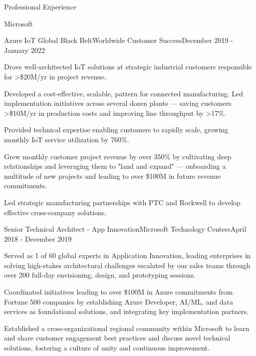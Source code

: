 \documentclass{resume} %
\begin{document}
\begin{rSection}{Professional Experience}
\begin{rCompany}{Microsoft}{}{}
    \begin{rSubSubsection}{Azure IoT Global Black Belt}{Worldwide Customer Success}{December 2019 - January 2022}
        \item Drove well-architected IoT solutions at strategic industrial customers responsible for >\$20M/yr in project revenue. 
        \item Developed a cost-effective, scalable, pattern for connected manufacturing. Led implementation initiatives across several dozen plants --- saving customers >\$10M/yr in production costs and improving line throughput by >17\%. 
        \item Provided technical expertise enabling customers to rapidly scale, growing monthly IoT service utilization by 760\%.
        \item Grew monthly customer project revenue by over 350\% by cultivating deep relationships and leveraging them to "land and expand" --- onboarding a multitude of new projects and leading to over \$100M in future revenue commitments.\
        \item Led strategic manufacturing partnerships with PTC and Rockwell to develop effective cross-company solutions.
    \end{rSubSubsection}
    
    \begin{rSubSubsection}{Senior Technical Architect - App Innovation}{Microsoft Technology Centers}{April 2018 - December 2019}
        \item Served as 1 of 60 global experts in Application Innovation, leading enterprises in solving high-stakes architectural challenges escalated by our sales teams through over 200 full-day envisioning, design, and prototyping sessions. 
        \item Coordinated initiatives leading to over \$100M in Azure commitments from Fortune 500 companies by establishing Azure Developer, AI/ML, and data services as foundational solutions, and integrating key implementation partners.
        \item Established a cross-organizational regional community within Microsoft to learn and share customer engagement best practices and discuss novel technical solutions, fostering a culture of unity and continuous improvement.
    \end{rSubSubsection}
  \end{rCompany}


\end{rSection}
\end{document}
